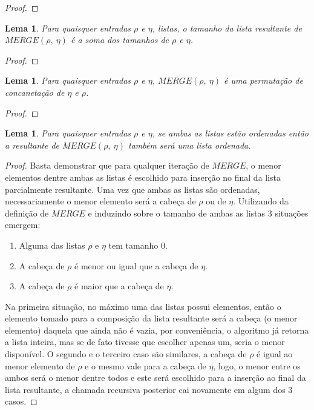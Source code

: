 \documentclass[12pt]{article}
\newtheorem{lemma}[theorem]{Lema}
\begin{document}
\begin{proof}

\end{proof}

\begin{lemma}
\label{merge-preserves-length}
        Para quaisquer entradas $\rho$ e $\eta$, listas, o tamanho da lista resultante de $MERGE(\rho,\ \eta)$ é a soma
        dos tamanhos de $\rho$ e $\eta$.
\end{lemma}

\begin{proof}

\end{proof}

\begin{lemma}
\label{merge-is-permutation}
        Para quaisquer entradas $\rho$ e $\eta$, $MERGE(\rho,\ \eta)$ é uma permutação de concanetação de $\eta$ e $\rho$.
\end{lemma}
\begin{proof}
        
\end{proof}

\begin{lemma}
\label{merge-of-sorted-is-sorted}
        Para quaisquer entradas $\rho$ e $\eta$, se ambas as listas estão ordenadas então
        a resultante de $MERGE(\rho,\ \eta)$ também será uma lista ordenada. 
\end{lemma}

\begin{proof}
        Basta demonstrar que para qualquer iteração de $MERGE$, o menor elementos dentre ambas as listas é escolhido para inserção no final
        da lista parcialmente resultante. Uma vez que ambas as listas são ordenadas, necessariamente o menor elemento será a cabeça de $\rho$ ou de $\eta$.
        Utilizando da definição de $MERGE$ e induzindo sobre o tamanho de ambas as listas 3 situações emergem:
        \begin{enumerate}
                \item Alguma das listas $\rho$ e $\eta$ tem tamanho 0.
                \item A cabeça de $\rho$ é menor ou igual que a cabeça de $\eta$.
                \item A cabeça de $\rho$ é maior que a cabeça de $\eta$.
        \end{enumerate}

        Na primeira situação, no máximo uma das listas possui elementos, então o elemento tomado para a composição da lista resultante será a cabeça
        (o menor elemento) daquela que ainda não é vazia, por conveniência, o algoritmo já retorna a lista inteira, mas se de fato tivesse que escolher apenas
        um, seria o menor disponível. O segundo e o terceiro caso são similares, a cabeça de $\rho$ é igual ao menor elemento de $\rho$ e o mesmo vale para a cabeça
        de $\eta$, logo, o menor entre os ambos será o menor dentre todos e este será escolhido para a inserção ao final da lista resultante, a chamada recursiva 
        posterior cai novamente em algum dos 3 casos.

\end{proof}
\end{document}
